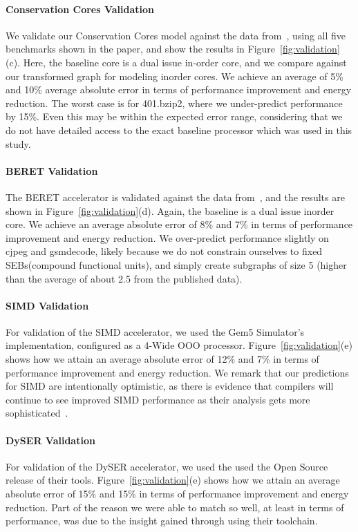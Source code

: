 \paragraph{Conservation Cores Validation}
We validate our Conservation Cores model against the data from~\cite{ccores}, using
all five benchmarks shown in the paper, and show the results in
Figure~\ref{fig:validation}(c).  Here, the baseline core is a dual issue in-order core,
and we compare against our transformed graph for modeling inorder cores.
We achieve an average of 5\% and 10\% average absolute
error in terms of performance improvement and energy reduction.  The worst case is for
401.bzip2, where we under-predict performance by 15\%.  Even this may be within the
expected error range, considering that we do not have detailed access to the exact
baseline processor which was used in this study.

\paragraph{BERET Validation}
The BERET accelerator is validated against the data 
from~\cite{Gupta:2011:BER:2155620.2155623}, and the results are shown in 
Figure~\ref{fig:validation}(d).  Again, the baseline is a dual issue inorder core.
We achieve an average absolute error of 8\% and 7\% in terms of performance improvement
and energy reduction.  We over-predict performance slightly on cjpeg and gsmdecode,
likely because we do not constrain ourselves to fixed SEBs(compound functional units), 
and simply create subgraphs of size 5 (higher than the average of about 2.5 from the published data).

\paragraph{SIMD Validation}
For validation of the SIMD accelerator, we used the Gem5 Simulator's implementation,
configured as a 4-Wide OOO processor.
Figure~\ref{fig:validation}(e) shows how we attain an average absolute 
error of 12\% and 7\% in terms of performance improvement and energy reduction.
We remark that our predictions for SIMD are intentionally optimistic, as there
is evidence that compilers will continue to see improved SIMD performance as
their analysis gets more sophisticated~\cite{6113845}.  

\paragraph{DySER Validation}
For validation of the DySER accelerator, we used the used the Open Source
release of their tools. Figure~\ref{fig:validation}(e) shows how we attain 
an average absolute error of 15\% and 15\% in terms of performance improvement 
and energy reduction. Part of the reason we were able to match so well, at
least in terms of performance, was due to the insight gained through using
their toolchain.

